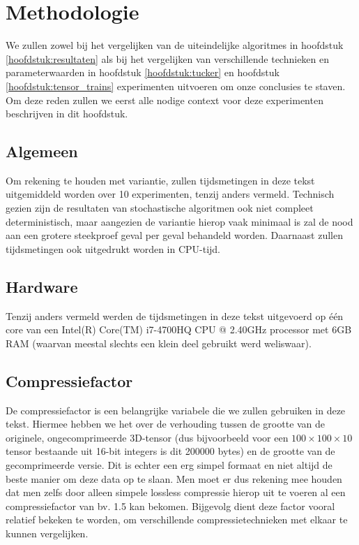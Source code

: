 \chapter{Methodologie}
\label{hoofdstuk:3}

We zullen zowel bij het vergelijken van de uiteindelijke algoritmes in hoofdstuk \ref{hoofdstuk:resultaten} als bij het vergelijken van verschillende technieken en parameterwaarden in hoofdstuk \ref{hoofdstuk:tucker} en hoofdstuk \ref{hoofdstuk:tensor_trains} experimenten uitvoeren om onze conclusies te staven. Om deze reden zullen we eerst alle nodige context voor deze experimenten beschrijven in dit hoofdstuk.

\section{Algemeen}
Om rekening te houden met variantie, zullen tijdsmetingen in deze tekst uitgemiddeld worden over 10 experimenten, tenzij anders vermeld. Technisch gezien zijn de resultaten van stochastische algoritmen ook niet compleet deterministisch, maar aangezien de variantie hierop vaak minimaal is zal de nood aan een grotere steekproef geval per geval behandeld worden. Daarnaast zullen tijdsmetingen ook uitgedrukt worden in CPU-tijd.

\section{Hardware}
Tenzij anders vermeld werden de tijdsmetingen in deze tekst uitgevoerd op \'e\'en core van een Intel(R) Core(TM) i7-4700HQ CPU @ 2.40GHz processor met 6GB RAM (waarvan meestal slechts een klein deel gebruikt werd weliswaar).

\section{Compressiefactor}

De compressiefactor is een belangrijke variabele die we zullen gebruiken in deze tekst. Hiermee hebben we het over de verhouding tussen de grootte van de originele, ongecomprimeerde 3D-tensor (dus bijvoorbeeld voor een $100 \times 100 \times 10$ tensor bestaande uit 16-bit integers is dit 200000 bytes) en de grootte van de gecomprimeerde versie. Dit is echter een erg simpel formaat en niet altijd de beste manier om deze data op te slaan. Men moet er dus rekening mee houden dat men zelfs door alleen simpele lossless compressie hierop uit te voeren al een compressiefactor van bv. 1.5 kan bekomen. Bijgevolg dient deze factor vooral relatief bekeken te worden, om verschillende compressietechnieken met elkaar te kunnen vergelijken.\\

